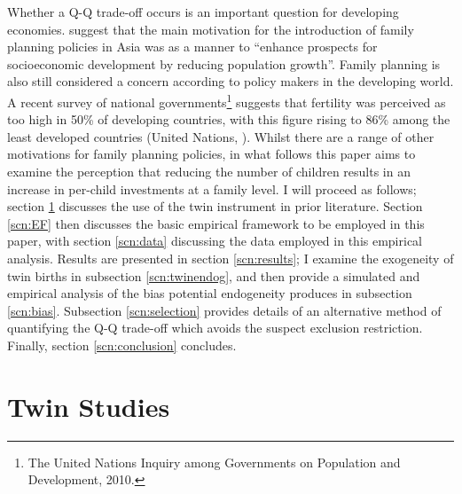 \documentclass{article}[11pt,subeqn]
\begin{document}
\begin{spacing}{1.5}
Whether a Q-Q trade-off occurs is an important question for developing economies.  \citet{Clelandetal2006} suggest that the main motivation for the 
introduction of family planning policies in Asia was as a manner to ``enhance prospects for socioeconomic development by reducing population growth''.  
Family planning is also still considered a concern according to policy makers in the developing world.  A recent survey of national governments\footnote{
The United Nations Inquiry among Governments on Population and Development, 2010.} suggests that fertility was perceived as too high in 50\% of 
developing countries, with this figure rising to 86\% among the least developed countries (United Nations, \citeyear{UN2010}).   Whilst there are a 
range of other motivations for family planning policies, in what follows this paper aims to examine the perception that reducing the number of children 
results in an increase in per-child investments at a family level.  I will proceed as follows; section \ref{scn:lit} discusses the use of the twin instrument in 
prior literature.  Section \ref{scn:EF} then discusses the basic empirical framework to be employed in this paper, with section \ref{scn:data} discussing the 
data employed in this empirical analysis.  Results are presented in section \ref{scn:results}; I examine the exogeneity of twin births in subsection 
\ref{scn:twinendog}, and then provide a simulated and empirical analysis of the bias potential endogeneity produces in subsection \ref{scn:bias}. Subsection 
\ref{scn:selection} provides details of an alternative method of quantifying the Q-Q trade-off which avoids the suspect exclusion restriction.  
Finally, section \ref{scn:conclusion} concludes. 

\section{Twin Studies}
\label{scn:lit}
\vspace{-5mm}



\end{spacing}
\end{document}
